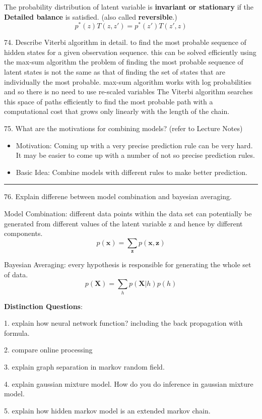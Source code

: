 \documentclass[11pt,a4paper]{article}
\newcommand{\bs}[1]{\boldsymbol{#1}}
\newcommand{\BOLD}[1]{\textbf{#1}}
\begin{document}
    The probability distribution of latent variable is \BOLD{invariant or stationary} if the \BOLD{Detailed balance} is satisfied. (also called \BOLD{reversible}.)
    $$ p^{*}(z) T(z,z') = p^{*}(z')T(z', z) $$

74. Describe Viterbi algorithm in detail.
    to find the most probable sequence of hidden states for a given observation sequence. this can be solved efficiently using the max-sum algorithm
    the problem of finding the most probable sequence of latent states is not the same as that of finding the set of states that are individually the most probable.
    max-sum algorithm works with log probabilities and so there is no need to use re-scaled variables
    The Viterbi algorithm searches this space of paths efficiently to find the most probable path with a computational cost that grows only linearly with the length of the chain.

75. What are the motivations for combining models? (refer to Lecture Notes)
    \begin{itemize}
    \item Motivation: Coming up with a very precise prediction rule can be very hard. It may be easier to come up with a number of not so precise prediction rules.
    \item Basic Idea: Combine models with different rules to make better prediction.
        \end{itemize}
\textcolor{blue}{\rule{\textwidth}{1mm}}

76. Explain differene between model combination and bayesian averaging.

Model Combination: different data points within the data set can potentially be generated from different values of the latent variable z and hence by different components.
$$ p(\bs{x}) = \sum_{\bs{z}} p(\bs{x},\bs{z}) $$

Bayesian Averaging: every hypothesis is responsible for generating the whole set of data.
$$ p(\bs{X}) = \sum_{h} p(\bs{X} | h) p(h) $$

\newpage
\BOLD{Distinction Questions}: 

1. explain how neural network function? including the back propagation with formula.

2. compare online processing  

3. explain graph separation in markov random field.

4. explain gaussian mixture model. How do you do inference in gaussian mixture model.

5. explain how hidden markov model is an extended markov chain.
\end{document}
